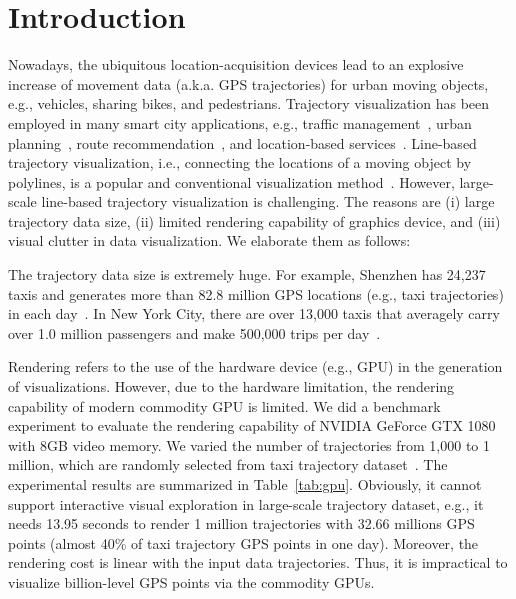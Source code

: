 \section{Introduction}\label{sec:intro}
Nowadays, the {ubiquitous} location-acquisition devices lead to an explosive increase of movement data (a.k.a. GPS trajectories) {for} urban moving objects, e.g., {vehicles}, sharing bikes, and pedestrians.
Trajectory {visualization has} been employed in many smart city applications, e.g.,  traffic management~\cite{wang2014visual}, urban planning~\cite{tang2017efficient}, route recommendation~\cite{zheng2011learning}, and location-based services~\cite{liu2016smartadp, zheng2010collaborative}.
Line-based trajectory visualization, i.e., connecting the {locations} of a {moving} object by polylines, is a popular and conventional visualization method~\cite{chen2015survey}.
However, {large-scale} line-based trajectory visualization is challenging.
The reasons are (i) large trajectory data size, (ii) limited rendering capability of graphics device, and (iii) visual clutter in data visualization.
We elaborate them as follows:

 The trajectory data size is extremely huge.
For example, Shenzhen has 24,237 taxis and generates more than 82.8 million GPS locations (e.g., taxi trajectories) in each day~\cite{sz}. %
In New York City, {there are} over 13,000 taxis {that} averagely {carry} over 1.0 million passengers and make 500,000 trips per day~\cite{ferreira2013visual}.

Rendering refers to the use of the hardware device (e.g., GPU) in the {generation} of {visualizations}.
However, due to the hardware limitation, the rendering capability of modern commodity GPU is limited.
We did a benchmark experiment to evaluate the rendering capability of NVIDIA GeForce GTX 1080 with 8GB video memory.
We varied the number of trajectories from 1,000 to 1 million, which are randomly selected from \pt{} taxi trajectory dataset~\cite{pt}.
The experimental results are summarized in Table~\ref{tab:gpu}.
Obviously, it cannot support interactive visual exploration in large-scale trajectory dataset, e.g.,
it needs 13.95 seconds to render 1 million trajectories with 32.66 millions GPS points (almost 40\% of \sz{} taxi trajectory GPS points in one day).
Moreover, the rendering cost is linear with the input data trajectories.
Thus, it is impractical to visualize billion-level GPS points via the commodity GPUs.

